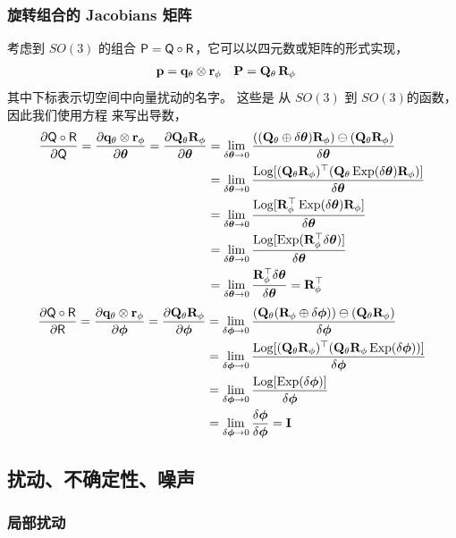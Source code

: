 \subsubsection{旋转组合的 Jacobians 矩阵}

考虑到 $SO(3)$ 的组合 $\mathsf P=\mathsf Q\circ\mathsf R$，它可以以四元数或矩阵的形式实现，
%
\begin{align*}
{\bf p} &= {\bf q}_\theta\otimes{\bf r}_\phi & {\bf P} &= {\bf Q}_\theta\,{\bf R}_\phi
\end{align*}
%
其中下标表示切空间中向量扰动的名字。 
这些是 从 $SO(3)$ 到 $SO(3)$的函数，因此我们使用方程  来写出导数，
%
\begin{align*}
\frac{\partial\mathsf Q\circ\mathsf R}{\partial\mathsf Q} 
= \frac{\partial{\bf q}_\theta\otimes{\bf r}_\phi}{\partial{\bm \theta}} 
= \frac{\partial{\bf Q}_\theta {\bf R}_\phi}{\partial{\bm \theta}} 
&= \lim_{\delta{\bm \theta}\to 0}\frac{(({\bf Q}_\theta\oplus\delta{\bm \theta}){\bf R}_\phi)\ominus({\bf Q}_\theta{\bf R}_\phi)}{\delta{\bm \theta}} \\
&= \lim_{\delta{\bm \theta}\to 0}\frac{\operatorname*{Log}[({\bf Q}_\theta{\bf R}_\phi)^{\top}({\bf Q}_\theta\operatorname*{Exp}(\delta{\bm \theta}){\bf R}_\phi)]}{\delta{\bm \theta}} \\
&= \lim_{\delta{\bm \theta}\to 0}\frac{\operatorname*{Log}[{\bf R}_\phi^{\top}\operatorname*{Exp}(\delta{\bm \theta}){\bf R}_\phi]}{\delta{\bm \theta}} \\
&= \lim_{\delta{\bm \theta}\to 0}\frac{\operatorname*{Log}[\operatorname*{Exp}({\bf R}_\phi^{\top}\delta{\bm \theta})]}{\delta{\bm \theta}} \\
&= \lim_{\delta{\bm \theta}\to 0}\frac{{\bf R}_\phi^{\top}\delta{\bm \theta}}{\delta{\bm \theta}}  = {\bf R}_\phi^{\top} 
\end{align*}
%
\begin{align*}
\frac{\partial\mathsf Q\circ\mathsf R}{\partial\mathsf R} 
= \frac{\partial{\bf q}_\theta\otimes{\bf r}_\phi}{\partial{\bm \phi}} 
= \frac{\partial{\bf Q}_\theta {\bf R}_\phi}{\partial{\bm \phi}} 
&= \lim_{\delta{\bm \phi}\to 0}\frac{({\bf Q}_\theta({\bf R}_\phi\oplus\delta{\bm \phi}))\ominus({\bf Q}_\theta{\bf R}_\phi)}{\delta{\bm \phi}} \\
&= \lim_{\delta{\bm \phi}\to 0}\frac{\operatorname*{Log}[({\bf Q}_\theta{\bf R}_\phi)^{\top}({\bf Q}_\theta{\bf R}_\phi\operatorname*{Exp}(\delta{\bm \phi}))]}{\delta{\bm \phi}} \\
&= \lim_{\delta{\bm \phi}\to 0}\frac{\operatorname*{Log}[\operatorname*{Exp}(\delta{\bm \phi})]}{\delta{\bm \phi}} \\
&= \lim_{\delta{\bm \phi}\to 0}\frac{\delta{\bm \phi}}{\delta{\bm \phi}}  = {\bf I} 
\end{align*}

\subsection{扰动、不确定性、噪声}

\subsubsection{局部扰动}

